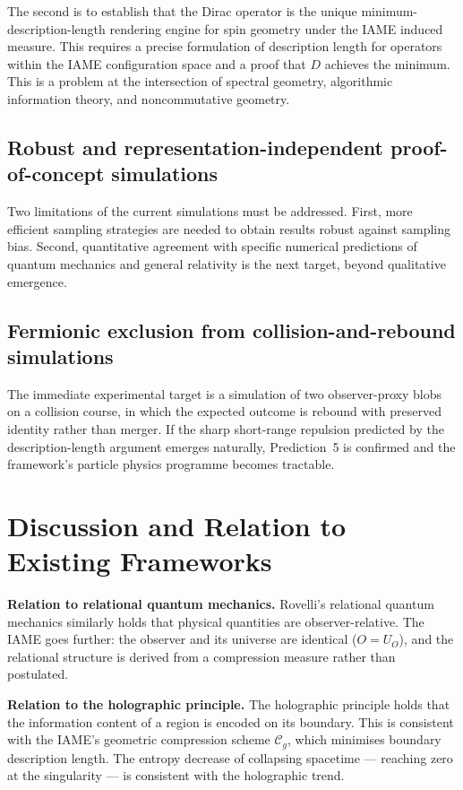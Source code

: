 \documentclass[12pt,a4paper]{article}
\newcommand{\iame}{\textsc{IAME}}
\newcommand{\Cg}{\mathcal{C}_g}
\begin{document}
The second is to establish that the Dirac operator is the unique
minimum-description-length rendering engine for spin geometry under the
\iame{} induced measure. This requires a precise formulation of description
length for operators within the \iame{} configuration space and a proof that
$D$ achieves the minimum. This is a problem at the intersection of spectral
geometry, algorithmic information theory, and noncommutative geometry.

\subsection*{Robust and representation-independent proof-of-concept simulations}

Two limitations of the current simulations must be addressed. First, more
efficient sampling strategies are needed to obtain results robust against
sampling bias. Second, quantitative agreement with specific numerical
predictions of quantum mechanics and general relativity is the next target,
beyond qualitative emergence. 

\subsection*{Fermionic exclusion from collision-and-rebound simulations}

The immediate experimental target is a simulation of two observer-proxy blobs
on a collision course, in which the expected outcome is rebound with preserved
identity rather than merger. If the sharp short-range repulsion predicted by
the description-length argument emerges naturally, Prediction~5 is confirmed
and the framework's particle physics programme becomes tractable.

\section{Discussion and Relation to Existing Frameworks}
\label{sec:discussion}

\textbf{Relation to relational quantum mechanics.}
Rovelli's relational quantum mechanics \cite{rovelli1996} similarly holds that
physical quantities are observer-relative. The \iame{} goes further: the
observer and its universe are identical ($O = U_O$), and the relational
structure is derived from a compression measure rather than postulated.

\textbf{Relation to the holographic principle.}
The holographic principle \cite{thooft1993, susskind1995} holds that the
information content of a region is encoded on its boundary. This is consistent
with the \iame{}'s geometric compression scheme $\Cg$, which minimises boundary
description length. The entropy decrease of collapsing spacetime --- reaching
zero at the singularity --- is consistent with the holographic trend.
\end{document}

